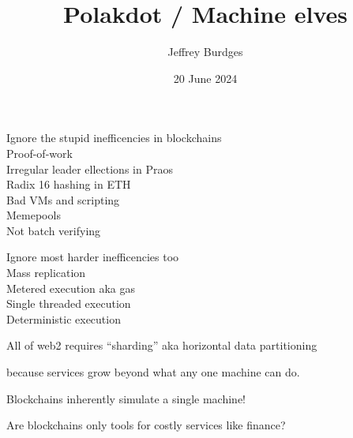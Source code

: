 \documentclass{beamer}
\title{Polakdot / Machine elves}
\author{Jeffrey Burdges}
\date{20 June 2024}
\begin{document}
\maketitle



\begin{frame}

Ignore the stupid inefficencies in blockchains \\ \medskip
\hspace{10pt} Proof-of-work \\
\hspace{10pt} Irregular leader ellections in Praos \\
\hspace{10pt} Radix 16 hashing in ETH \\
\hspace{10pt} Bad VMs and scripting \\
\hspace{10pt} Memepools \\
\hspace{10pt} Not batch verifying \\

\pause\bigskip\bigskip

Ignore most harder inefficencies too \\ \medskip
\hspace{10pt} Mass replication \\
\hspace{10pt} Metered execution aka gas \\
\hspace{10pt} Single threaded execution \\
\hspace{10pt} Deterministic execution \\

\end{frame}



\begin{frame}

All of web2 requires ``sharding'' aka horizontal data partitioning \\ \medskip

\hspace{10pt} because services grow beyond what any one machine can do.

\pause\bigskip\bigskip\bigskip

Blockchains inherently simulate a single machine!

\pause\bigskip\bigskip\bigskip

Are blockchains only tools for costly services like finance?

\end{frame}
\end{document}
